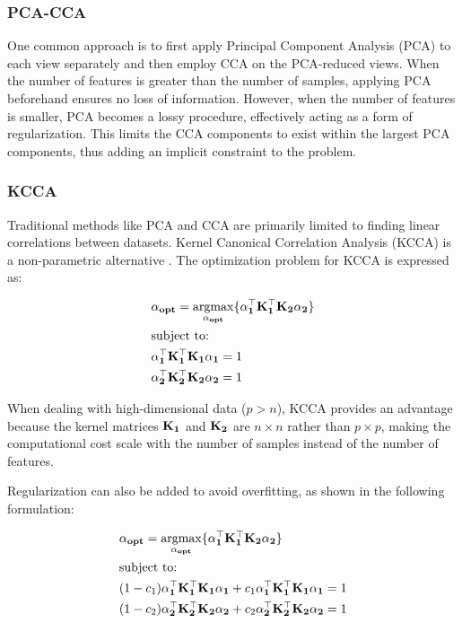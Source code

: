 \subsubsection{PCA-CCA}

One common approach is to first apply Principal Component Analysis (PCA) to each view separately and then employ CCA on the PCA-reduced views. When the number of features is greater than the number of samples, applying PCA beforehand ensures no loss of information. However, when the number of features is smaller, PCA becomes a lossy procedure, effectively acting as a form of regularization. This limits the CCA components to exist within the largest PCA components, thus adding an implicit constraint to the problem.

\subsubsection{KCCA}

Traditional methods like PCA and CCA are primarily limited to finding linear correlations between datasets. Kernel Canonical Correlation Analysis (KCCA) is a non-parametric alternative \cite{hardoon2004canonical}. The optimization problem for KCCA is expressed as:

\begin{align}
    & \bold{\alpha_{opt}}=\underset{\bold{\alpha_{opt}}}{\mathrm{argmax}}\{ \bold{\alpha_1^{\top}K_1^{\top}K_2\alpha_2}  \}\\
    & \text{subject to:} \notag\\
    & \bold{\alpha_1^{\top}K_1^{\top}K_1\alpha_1}=1 \notag\\
    & \bold{\alpha_2^{\top}K_2^{\top}K_2\alpha_2}=1 \notag
\end{align}

When dealing with high-dimensional data ($p>n$), KCCA provides an advantage because the kernel matrices $\bold{K_1}$ and $\bold{K_2}$ are $n \times n$ rather than $p \times p$, making the computational cost scale with the number of samples instead of the number of features.

Regularization can also be added to avoid overfitting, as shown in the following formulation:

\begin{align}
    & \bold{\alpha_{opt}}=\underset{\bold{\alpha_{opt}}}{\mathrm{argmax}}\{ \bold{\alpha_1^{\top}K_1^{\top}K_2\alpha_2}  \}\\
    & \text{subject to:} \notag\\
    & (1-c_1)\bold{\alpha_1^{\top}K_1^{\top}K_1\alpha_1}+c_1\bold{\alpha_1^{\top}K_1^{\top}K_1\alpha_1}=1 \notag\\
    & (1-c_2)\bold{\alpha_2^{\top}K_2^{\top}K_2\alpha_2}+c_2\bold{\alpha_2^{\top}K_2^{\top}K_2\alpha_2}=1 \notag
\end{align}

